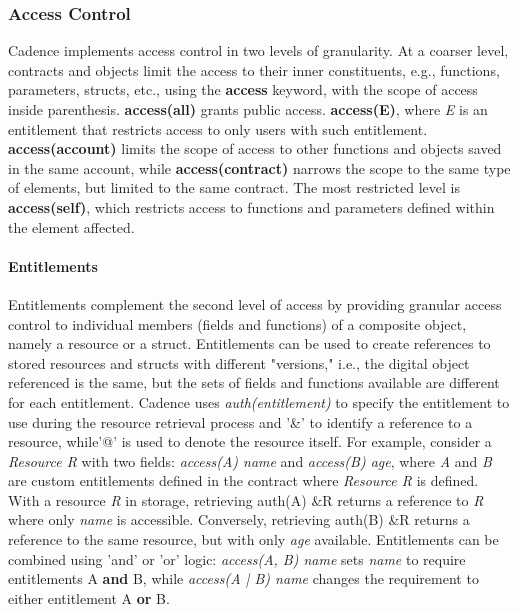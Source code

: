 \documentclass[../NFTComp_IEEE.tex]{subfiles}
\begin{document}
\subsubsection{Access Control}
Cadence implements access control in two levels of granularity. At a coarser level, contracts and objects limit the access to their inner constituents, e.g., functions, parameters, structs, etc., using the \textbf{access} keyword, with the scope of access inside parenthesis. \textbf{access(all)} grants public access. \textbf{access(E)}, where \textit{E} is an entitlement that restricts access to only users with such entitlement. \textbf{access(account)} limits the scope of access to other functions and objects saved in the same account, while \textbf{access(contract)} narrows the scope to the same type of elements, but limited to the same contract. The most restricted level is \textbf{access(self)}, which restricts access to functions and parameters defined within the element affected.

\paragraph{Entitlements}
Entitlements complement the second level of access by providing granular access control to individual members (fields and functions) of a composite object, namely a resource or a struct. Entitlements can be used to create references to stored resources and structs with different "versions," i.e., the digital object referenced is the same, but the sets of fields and functions available are different for each entitlement. Cadence uses \textit{auth(entitlement)} to specify the entitlement to use during the resource retrieval process and '\&' to identify a reference to a resource, while'@' is used to denote the resource itself. For example, consider a \textit{Resource R} with two fields: \textit{access(A) name} and \textit{access(B) age}, where \textit{A} and \textit{B} are custom entitlements defined in the contract where \textit{Resource R} is defined. With a resource \textit{R} in storage, retrieving auth(A) \&R returns a reference to \textit{R} where only \textit{name} is accessible. Conversely, retrieving auth(B) \&R returns a reference to the same resource, but with only \textit{age} available. Entitlements can be combined using 'and' or 'or' logic: \textit{access(A, B) name} sets \textit{name} to require entitlements A \textbf{and} B, while \textit{access(A | B) name} changes the requirement to either entitlement A \textbf{or} B.
\end{document}
